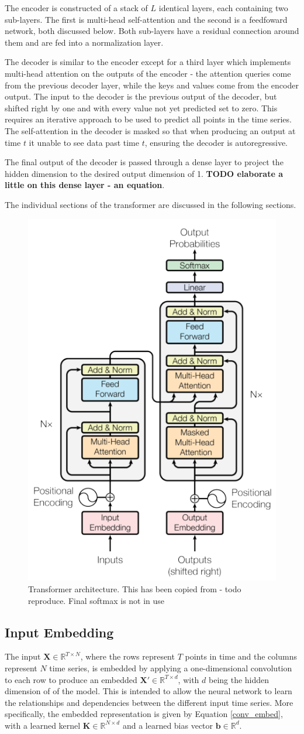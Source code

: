 \documentclass[conference]{IEEEtran}
\begin{document}
The encoder is constructed of a stack of $L$ identical layers, each containing two sub-layers.
The first is multi-head self-attention and the second is a feedfoward network, both discussed below.
Both sub-layers have a residual connection around them and are fed into a normalization layer.

The decoder is similar to the encoder except for a third layer which implements multi-head attention on the outputs of the encoder - the attention queries come from the previous decoder layer, while the keys and values come from the encoder output.
The input to the decoder is the previous output of the decoder, but shifted right by one and with every value not yet predicted set to zero.
This requires an iterative approach to be used to predict all points in the time series.
The self-attention in the decoder is masked so that when producing an output at time $t$ it unable to see data past time $t$, ensuring the decoder is autoregressive.

The final output of the decoder is passed through a dense layer to project the hidden dimension to the desired output dimension of 1.
\textbf{TODO elaborate a little on this dense layer - an equation}.

The individual sections of the transformer are discussed in the following sections.

\begin{figure}[htbp]
	\centerline{\includegraphics[width=.35\textwidth]{images/transformer_vaswani_copied.png}}
	\caption{Transformer architecture. This has been copied from \cite{Vaswani2017} - todo reproduce. Final softmax is not in use}
	\label{fig:transformer}
\end{figure}

\subsection{Input Embedding}
The input $\boldsymbol{X} \in \mathbb{R}^{T \times N}$, where the rows represent $T$ points in time and the columns represent $N$ time series, is embedded by applying a one-dimensional convolution to each row to produce an embedded $\boldsymbol{X}' \in \mathbb{R}^{T \times d}$, with $d$ being the hidden dimension of of the model.
This is intended to allow the neural network to learn the relationships and dependencies between the different input time series.
More specifically, the embedded representation is given by Equation \ref{conv_embed}, with a learned kernel $\boldsymbol{K} \in \mathbb{R}^{N \times d}$ and a learned bias vector $\boldsymbol{b} \in \mathbb{R}^{d}$.
\end{document}
